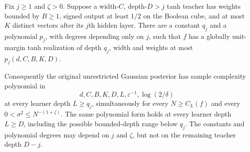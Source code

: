 \begin{theorem}
\label{thm:fixed-prefix-finite-state}
Fix $j\ge1$ and $\zeta>0$. Suppose a width-$C$, depth-$D>j$ tanh
teacher has weights bounded by $B\ge1$, signed output at least $1/2$
on the Boolean cube, and at most $K$ distinct vectors after its $j$th
hidden layer. There are a constant $q_j$ and a polynomial $p_j$, with
degrees depending only on $j$, such that $f$ has a globally
unit-margin tanh realization of depth $q_j$, width and weights at most
$p_j(d,C,B,K,D)$.

Consequently the original unrestricted Gaussian posterior has sample
complexity polynomial in
\[
 d,C,B,K,D,L,\varepsilon^{-1},\log(2/\delta)
\]
at every learner depth $L\ge q_j$, simultaneously for every
$N\ge C_L(f)$ and every $0<\sigma^2\le N^{-(1+\zeta)}$.
The same polynomial form holds at every learner depth $L\ge D$,
including the possible bounded-depth range below $q_j$.
The constants and polynomial degrees may depend on $j$ and $\zeta$,
but not on the remaining teacher depth $D-j$.
\end{theorem}

